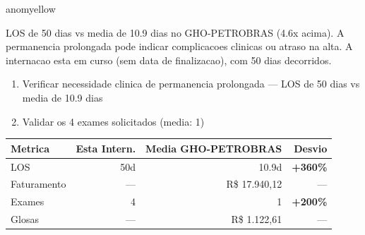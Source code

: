 \documentclass[a4paper,10pt]{article}
\begin{document}
\begin{anomalycard}[Internacao 164039 | GHO-PETROBRAS | MODERADO (z=2.06)]{anomyellow}
\vspace{2pt}\begin{tcolorbox}[colback=severityred!20,colframe=anomyellow,title={\textbf{Interpretacao de Negocio}},fonttitle=\bfseries\small,left=4pt,right=4pt,top=3pt,bottom=3pt]
{\small LOS de 50 dias vs media de 10.9 dias no GHO-PETROBRAS (4.6x acima). A permanencia prolongada pode indicar complicacoes clinicas ou atraso na alta. A internacao esta em curso (sem data de finalizacao), com 50 dias decorridos.}
\end{tcolorbox}
\begin{tcolorbox}[colback=severityyellow!30,colframe=anomorange,title={\textbf{Recomendacoes Especificas}},fonttitle=\bfseries\small,left=4pt,right=4pt,top=3pt,bottom=3pt]
\begin{enumerate}[nosep,leftmargin=16pt]
\item {\small Verificar necessidade clinica de permanencia prolongada --- LOS de 50 dias vs media de 10.9 dias}
\item {\small Validar os 4 exames solicitados (media: 1)}
\end{enumerate}
\end{tcolorbox}
\begin{center}\begin{tabular}{l r r r}\toprule\textbf{Metrica} & \textbf{Esta Intern.} & \textbf{Media GHO-PETROBRAS} & \textbf{Desvio} \\\midrule
LOS & 50d & 10.9d & \textcolor{anomred}{\textbf{+360\%}} \\
Faturamento & --- & R\$ 17.940,12 & --- \\
Exames & 4 & 1 & \textcolor{anomred}{\textbf{+200\%}} \\
Glosas & --- & R\$ 1.122,61 & --- \\
\bottomrule\end{tabular}\end{center}


\end{anomalycard}
\end{document}
